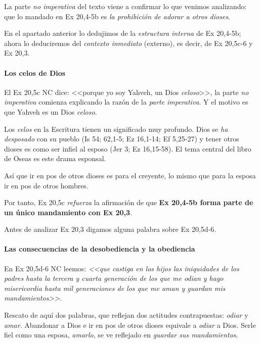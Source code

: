 \documentclass{article}
\begin{document}
La parte \emph{no imperativa} del texto viene a confirmar lo que venimos analizando: que lo mandado en Ex 20,4-5b es \emph{la prohibici\'on de adorar a otros dioses}.

En el apartado anterior lo dedujimos de la \emph{estructura interna} de Ex 20,4-5b; ahora lo deduciremos del \emph{contexto inmediato} (externo), es decir, de Ex 20,5c-6 y Ex 20,3.

\paragraph{Los celos de Dios}

El Ex 20,5c NC dice: <<porque yo soy Yahveh, un Dios \emph{celoso}>>, la parte \emph{no imperativa} comienza explicando la raz\'on de la \emph{parte imperativa}. Y el motivo es que Yahveh es un Dios \emph{celoso}.

Los \emph{celos} en la Escritura tienen un significado muy profundo. Dios se \emph{ha desposado} con su pueblo (Is 54; 62,1-5; Ez 16,1-14; Ef 5,25-27) y tener otros dioses es como ser infiel al esposo (Jer 3; Ez 16,15-58). El tema central del libro de Oseas es este drama esponsal.

As\'{i} que ir en pos de otros dioses es para el creyente, lo mismo que para la esposa ir en pos de otros hombres.%

Por tanto, Ex 20,5c \emph{refuerza} la afirmaci\'on de que \textbf{Ex 20,4-5b forma parte de un \'unico mandamiento con Ex 20,3}.

Antes de analizar Ex 20,3 digamos alguna palabra sobre Ex 20,5d-6.

\paragraph{Las consecuencias de la desobediencia y la obediencia}

En Ex 20,5d-6 NC leemos: \emph{<<que castiga en los hijos las iniquidades de los padres hasta la tercera y cuarta generaci\'on de los que me odian y hago misericordia hasta mil generaciones de los que me aman y guardan mis mandamientos>>}.

Rescato de aqu\'{i} dos palabras, que reflejan dos actitudes contrapuestas: \emph{odiar} y \emph{amar}. Abandonar a Dios e ir en pos de otros dioses equivale a \emph{odiar} a Dios. Serle fiel como una esposa, \emph{amarlo}, se ve reflejado en \emph{guardar sus mandamientos}.
\end{document}
